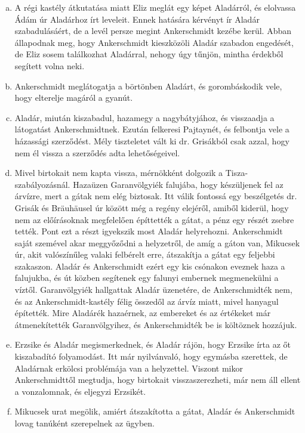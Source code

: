 \documentclass{thesis-ekf}
\begin{document}
    \begin{enumerate}[a)]
        \item\label{itm:Eliz-folyamodvany} A régi kastély átkutatása miatt Eliz meglát egy képet Aladárról,
            és elolvassa Ádám úr Aladárhoz írt leveleit.
        Ennek hatására kérvényt ír Aladár szabadulásáért, de a levél persze megint Ankerschmidt kezébe kerül.
        Abban állapodnak meg, hogy Ankerschmidt kieszközöli Aladár szabadon engedését, de Eliz sosem találkozhat Aladárral,
            nehogy úgy tűnjön, mintha érdekből segített volna neki.
        \item\label{itm:varborton} Ankerschmidt meglátogatja a börtönben Aladárt, és gorombáskodik vele, hogy elterelje magáról a gyanút.
        \item\label{itm:Aladar-hazaer} Aladár, miután kiszabadul, hazamegy a nagybátyjához, és visszaadja a látogatást Ankerschmidtnek.
        Ezután felkeresi Pajtaynét, és felbontja vele a házassági szerződést.
        Mély tiszteletet vált ki dr. Grisákból csak azzal, hogy nem él vissza a szerződés adta lehetőségeivel.
        \item\label{itm:a-kozos-baj} Mivel birtokait nem kapta vissza, mérnökként dolgozik a Tisza-szabályozásnál.
        Hazaüzen Garanvölgyiék falujába, hogy készüljenek fel az árvízre, mert a gátak nem elég biztosak.
        Itt válik fontossá egy beszélgetés dr. Grisák és Bräuhäusel úr között még a regény elejéről, amiből kiderül,
            hogy nem az előírásoknak megfelelően építtették a gátat, a pénz egy részét zsebre tették.
        Pont ezt a részt igyekszik most Aladár helyrehozni.
        Ankerschmidt saját szemével akar meggyőződni a helyzetről, de amíg a gáton van, Mikucsek úr, akit valószínűleg
            valaki felbérelt erre, átszakítja a gátat egy feljebbi szakaszon.
        Aladár és Ankerschmidt ezért egy kis csónakon eveznek haza a falujukba, és út közben segítenek egy falunyi embernek
            megmenekülni a víztől.
        Garanvölgyiék hallgattak Aladár üzenetére, de Ankerschmidték nem, és az Ankerschmidt-kastély félig összedől
            az árvíz miatt, mivel hanyagul építették.
        Mire Aladárék hazaérnek, az embereket és az értékeket már átmenekítették Garanvölgyihez, és Ankerschmidték
            be is költöznek hozzájuk.
        \item\label{itm:Aladar-es-Erzsike} Erzsike és Aladár megismerkednek, és Aladár rájön, hogy Erzsike írta az őt kiszabadító folyamodást.
        Itt már nyilvánvaló, hogy egymásba szerettek, de Aladárnak erkölcsi problémája van a helyzettel.
        Viszont mikor Ankerschmidttől megtudja, hogy birtokait visszaszerezheti, már nem áll ellent a vonzalomnak,
            és eljegyzi Erzsikét.
        \item\label{itm:per} Mikucsek urat megölik, amiért átszakította a gátat, Aladár és Ankerschmidt lovag tanúként szerepelnek az ügyben.
\end{enumerate}
\end{document}
